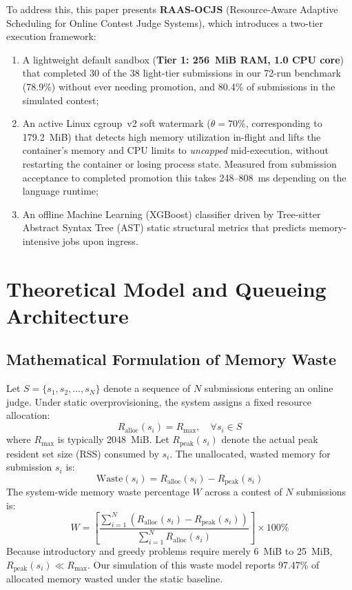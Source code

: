 \documentclass[conference]{IEEEtran}
\begin{document}
To address this, this paper presents \textbf{RAAS-OCJS} (Resource-Aware Adaptive Scheduling for Online Contest Judge Systems), which introduces a two-tier execution framework:
\begin{enumerate}
    \item A lightweight default sandbox (\textbf{Tier 1: 256~MiB RAM, 1.0 CPU core}) that completed 30 of the 38 light-tier submissions in our 72-run benchmark (78.9\%) without ever needing promotion, and 80.4\% of submissions in the simulated contest;
    \item An active Linux cgroup~v2 soft watermark ($\theta = 70\%$, corresponding to 179.2~MiB) that detects high memory utilization in-flight and lifts the container's memory and CPU limits to \emph{uncapped} mid-execution, without restarting the container or losing process state. Measured from submission acceptance to completed promotion this takes 248--808~ms depending on the language runtime;
    \item An offline Machine Learning (XGBoost) classifier driven by Tree-sitter Abstract Syntax Tree (AST) static structural metrics that predicts memory-intensive jobs upon ingress.
\end{enumerate}



\section{Theoretical Model and Queueing Architecture}

\subsection{Mathematical Formulation of Memory Waste}
Let $S = \{s_1, s_2, \dots, s_N\}$ denote a sequence of $N$ submissions entering an online judge. Under static overprovisioning, the system assigns a fixed resource allocation:
\begin{equation}
R_{\mathrm{alloc}}(s_i) = R_{\mathrm{max}}, \quad \forall s_i \in S
\end{equation}
where $R_{\mathrm{max}}$ is typically 2048~MiB. Let $R_{\mathrm{peak}}(s_i)$ denote the actual peak resident set size (RSS) consumed by $s_i$. The unallocated, wasted memory for submission $s_i$ is:
\begin{equation}
\mathrm{Waste}(s_i) = R_{\mathrm{alloc}}(s_i) - R_{\mathrm{peak}}(s_i)
\end{equation}
The system-wide memory waste percentage $W$ across a contest of $N$ submissions is:
\begin{equation}
W = \left[ \frac{\sum_{i=1}^N \left( R_{\mathrm{alloc}}(s_i) - R_{\mathrm{peak}}(s_i) \right)}{\sum_{i=1}^N R_{\mathrm{alloc}}(s_i)} \right] \times 100\%
\end{equation}
Because introductory and greedy problems require merely 6~MiB to 25~MiB, $R_{\mathrm{peak}}(s_i) \ll R_{\mathrm{max}}$. Our simulation of this waste model reports 97.47\% of allocated memory wasted under the static baseline.
\end{document}
